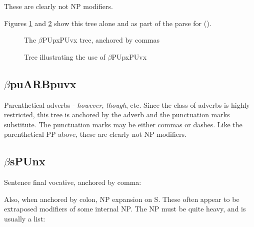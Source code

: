 \noindent
These are clearly not NP modifiers. 

Figures \ref{betaPUpxPUvx} and \ref{PUpxPUvx-anger} show this tree
alone and as part of the parse for ().

\begin{figure}[hbt]
\centering
\hspace{0.0in}
\caption{The $\beta$PUpxPUvx tree, anchored by commas}
\label{betaPUpxPUvx}
\end{figure}

\begin{figure}[hbt]
\centering
\hspace{0.0in}
\caption{Tree illustrating the use of $\beta$PUpxPUvx}
\label{PUpxPUvx-anger}
\end{figure}

\subsection{$\beta$puARBpuvx}
\label{par-adverb}

Parenthetical adverbs - {\it however}, {\it though}, etc. Since the
class of adverbs is highly restricted, this tree is anchored by the
adverb and the punctuation marks substitute.  The punctuation marks
may be either commas or dashes.  Like the parenthetical PP above,
these are clearly not NP modifiers.


\subsection{$\beta$sPUnx}

Sentence final vocative, anchored by comma:  
 

Also, when anchored by colon, NP expansion on S. These often appear to
be extraposed modifiers of some internal NP. The NP must be quite
heavy, and is usually a list:


